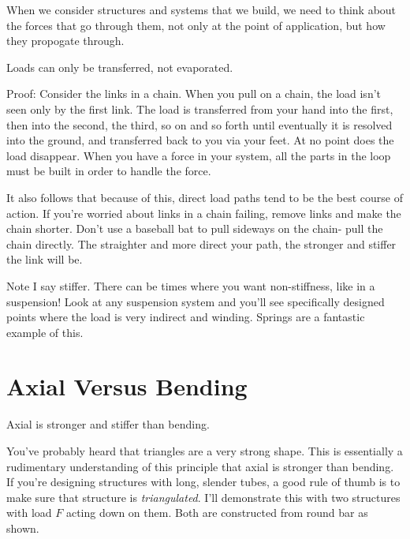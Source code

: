 When we consider structures and systems that we build, we need to think about the forces that go through them, not only at the point of application, but how they propogate through.

\begin{theorem} \label{theorem:load_paths}
	Loads can only be transferred, not evaporated.
\end{theorem}

Proof: Consider the links in a chain. When you pull on a chain, the load isn't seen only by the first link. The load is transferred from your hand into the first, then into the second, the third, so on and so forth until eventually it is resolved into the ground, and transferred back to you via your feet. At no point does the load disappear. When you have a force in your system, all the parts in the loop must be built in order to handle the force.

It also follows that because of this, direct load paths tend to be the best course of action. If you're worried about links in a chain failing, remove links and make the chain shorter. Don't use a baseball bat to pull sideways on the chain- pull the chain directly. The straighter and more direct your path, the stronger and stiffer the link will be.

Note I say stiffer. There can be times where you want non-stiffness, like in a suspension! Look at any suspension system and you'll see specifically designed points where the load is very indirect and winding. Springs are a fantastic example of this.

\section{Axial Versus Bending}

\begin{theorem} \label{theorem:axial_bending}
	Axial is stronger and stiffer than bending.
\end{theorem}

You've probably heard that triangles are a very strong shape. This is essentially a rudimentary understanding of this principle that axial is stronger than bending. If you're designing structures with long, slender tubes, a good rule of thumb is to make sure that structure is \textit{triangulated}.
I'll demonstrate this with two structures with load $F$ acting down on them. Both are constructed from round bar as shown. 

